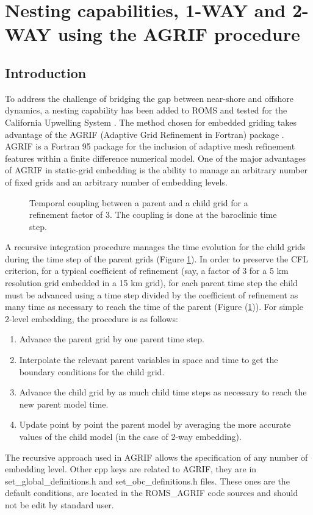 \section{Nesting capabilities, 1-WAY and 2-WAY using the AGRIF procedure}

\subsection{Introduction}
To address the challenge of bridging the gap between near-shore and offshore
dynamics, a nesting capability has been added to ROMS and tested for the California
Upwelling System \citep{Pen04}.  The method chosen for embedded griding takes
advantage of the AGRIF (Adaptive Grid Refinement in Fortran) package
\citep{Bla99,Deb00, Deb03a,Deb03b,Deb08}.  AGRIF is a Fortran 95 package for the
inclusion of adaptive mesh refinement features within a finite difference numerical
model. One of the major advantages of AGRIF in static-grid embedding is the ability
to manage an arbitrary number of fixed grids and an arbitrary number of embedding
levels.

\begin{figure}[htbp]
\centerline{}
\caption{Temporal coupling between a parent and a child grid for a refinement factor
  of 3.  The coupling is done at the baroclinic time step.}
\label{fig:temp_coupling}
\end{figure}

A recursive integration procedure manages the time evolution for the child grids
during the time step of the parent grids (Figure \ref{fig:temp_coupling}). In order
to preserve the CFL criterion, for a typical coefficient of refinement (say, a factor
of 3 for a 5 km resolution grid embedded in a 15 km grid), for each parent time step
the child must be advanced using a time step divided by the coefficient of refinement
as many time as necessary to reach the time of the parent (Figure
(\ref{fig:temp_coupling})).  For simple 2-level embedding, the
procedure is as follows:\\
\begin{enumerate}
\item Advance the parent grid by one parent time step.
\item Interpolate the relevant parent variables in space and time to get the boundary
  conditions for the child grid.
\item Advance the child grid by as much child time steps as necessary
to reach the new parent model time.
\item Update point by point the parent model by averaging the more accurate values of
  the child model (in the case of 2-way embedding).
\end{enumerate}
The recursive approach used in AGRIF allows the specification of any number of
embedding level. Other cpp keys are related to AGRIF, they are in
  set\_global\_definitions.h and set\_obc\_definitions.h files. These ones are the
  default conditions, are located in the ROMS\_AGRIF code sources and should not be
  edit by standard user.

